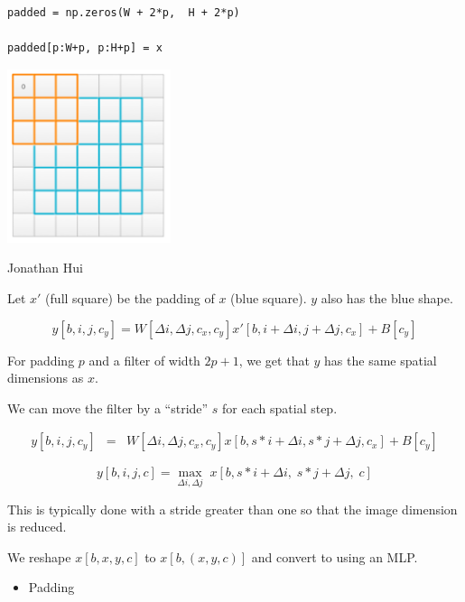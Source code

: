 {\vfill
\begin{verbatim}
padded = np.zeros(W + 2*p,  H + 2*p)

padded[p:W+p, p:H+p] = x
\end{verbatim}


\centerline{\includegraphics[height = 2.0in]{../images/padding2}}
\centerline{\large Jonathan Hui}

Let $x'$ (full square) be the padding of $x$ (blue square).  $y$ also has the blue shape.

\vfill
$$y[b,i,j,c_y]  =   W[\Delta i, \Delta j, c_x, c_y] x'[b,i + \Delta i, j + \Delta j, c_x] + B[c_y]$$

\vfill
\vfill
For padding $p$ and a filter of width $2p+1$, we get that $y$ has the same spatial dimensions as $x$.



We can move the filter by a ``stride'' $s$ for each spatial step.

\vfill
\begin{eqnarray*}
  y[b,i,j,c_y] & = &  W[\Delta i, \Delta j, c_x, c_y] x[b,s*i + \Delta i, s*j + \Delta j, c_x] + B[c_y]
\end{eqnarray*}


$$y[b,i,j,c] = \max_{\Delta i, \Delta j}\; x[b,s*i + \Delta i,\; s*j + \Delta j,\; c]$$

\vfill
This is typically done with a stride greater than one so that the image dimension is reduced.




We reshape $x[b,x,y,c]$ to $x[b,(x,y,c)]$ and convert to using an MLP.


\begin{itemize}
\item Padding


\end{itemize}}
